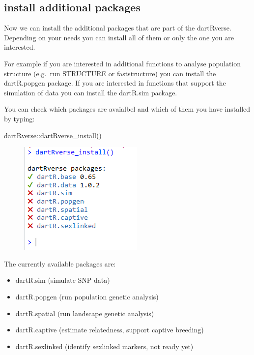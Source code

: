 \documentclass[
  letterpaper,
  DIV=11,
  numbers=noendperiod]{scrreprt}
\newenvironment{Shaded}{\begin{snugshade}}{\end{snugshade}}
\newcommand{\FunctionTok}[1]{\textcolor[rgb]{0.02,0.16,0.49}{#1}}
\newcommand{\NormalTok}[1]{\textcolor[rgb]{0.00,0.44,0.13}{#1}}
\newcommand{\SpecialCharTok}[1]{\textcolor[rgb]{0.25,0.44,0.63}{#1}}
\providecommand{\tightlist}{%
  \setlength{\itemsep}{0pt}\setlength{\parskip}{0pt}}\usepackage{longtable,booktabs,array}
\begin{document}
\hypertarget{install-additional-packages}{%
\subsection*{install additional
packages}\label{install-additional-packages}}

Now we can install the additional packages that are part of the
dartRverse. Depending on your needs you can install all of them or only
the one you are interested.

For example if you are interested in additional functions to analyse
population structure (e.g.~run STRUCTURE or faststructure) you can
install the dartR.popgen package. If you are interested in functions
that support the simulation of data you can install the dartR.sim
package.

You can check which packages are avaialbel and which of them you have
installed by typing:

\begin{Shaded}
\begin{Highlighting}[]
\NormalTok{dartRverse}\SpecialCharTok{::}\FunctionTok{dartRverse\_install}\NormalTok{()}
\end{Highlighting}
\end{Shaded}

\begin{figure}

\includegraphics{images/dartRverse_install.png} \hfill{}

\end{figure}

The currently available packages are:

\begin{itemize}
\tightlist
\item
  dartR.sim (simulate SNP data)
\item
  dartR.popgen (run population genetic analysis)
\item
  dartR.spatial (run landscape genetic analysis)
\item
  dartR.captive (estimate relatedness, support captive breeding)
\item
  dartR.sexlinked (identify sexlinked markers, not ready yet)
\end{itemize}
\end{document}
